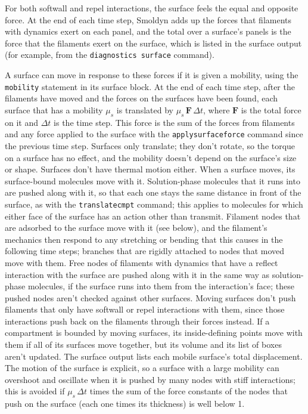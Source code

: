 \documentclass {scrbook}
\newcommand {\ttt} {\texttt}
\begin{document}
\begin{itemize}
For both softwall and repel interactions, the surface feels the equal and opposite force. At the end of each time step, Smoldyn adds up the forces that filaments with dynamics exert on each panel, and the total over a surface's panels is the force that the filaments exert on the surface, which is listed in the surface output (for example, from the \ttt{diagnostics surface} command).

A surface can move in response to these forces if it is given a mobility, using the \ttt{mobility} statement in its surface block. At the end of each time step, after the filaments have moved and the forces on the surfaces have been found, each surface that has a mobility $\mu_s$ is translated by $\mu_s\,\bm{F}\,\Delta t$, where $\bm{F}$ is the total force on it and $\Delta t$ is the time step. This force is the sum of the forces from filaments and any force applied to the surface with the \ttt{applysurfaceforce} command since the previous time step. Surfaces only translate; they don't rotate, so the torque on a surface has no effect, and the mobility doesn't depend on the surface's size or shape. Surfaces don't have thermal motion either. When a surface moves, its surface-bound molecules move with it. Solution-phase molecules that it runs into are pushed along with it, so that each one stays the same distance in front of the surface, as with the \ttt{translatecmpt} command; this applies to molecules for which either face of the surface has an action other than transmit. Filament nodes that are adsorbed to the surface move with it (see below), and the filament's mechanics then respond to any stretching or bending that this causes in the following time steps; branches that are rigidly attached to nodes that moved move with them. Free nodes of filaments with dynamics that have a reflect interaction with the surface are pushed along with it in the same way as solution-phase molecules, if the surface runs into them from the interaction's face; these pushed nodes aren't checked against other surfaces. Moving surfaces don't push filaments that only have softwall or repel interactions with them, since those interactions push back on the filaments through their forces instead. If a compartment is bounded by moving surfaces, its inside-defining points move with them if all of its surfaces move together, but its volume and its list of boxes aren't updated. The surface output lists each mobile surface's total displacement. The motion of the surface is explicit, so a surface with a large mobility can overshoot and oscillate when it is pushed by many nodes with stiff interactions; this is avoided if $\mu_s\,\Delta t$ times the sum of the force constants of the nodes that push on the surface (each one times its thickness) is well below 1.


\end{itemize}
\end{document}
